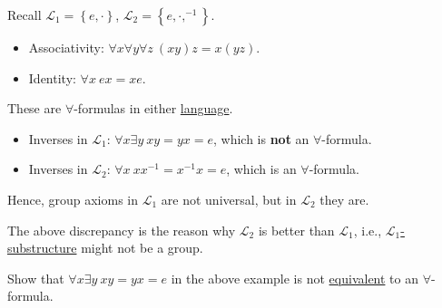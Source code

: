 \begin{eg}
	Recall \(\mathcal{L} _1 = \left\{ e, \cdot \right\} \), \(\mathcal{L} _2=\left\{ e, \cdot, ^{-1} \right\} \).
	\begin{itemize}
		\item Associativity: \(\forall x \forall y \forall z\ (xy)z = x(yz)\).
		\item Identity: \(\forall x\ ex = xe\).
	\end{itemize}
	These are \(\forall \)-formulas in either \hyperref[def:language]{language}.
	\begin{itemize}
		\item Inverses in \(\mathcal{L} _1\): \(\forall x \exists y\ xy = yx = e\), which is \textbf{not} an \(\forall \)-formula.
		\item Inverses in \(\mathcal{L} _2\): \(\forall x\ x x ^{-1} = x ^{-1} x = e\), which is an \(\forall \)-formula.
	\end{itemize}
	Hence, group axioms in \(\mathcal{L} _1\) are not universal, but in \(\mathcal{L} _2\) they are.
\end{eg}

\begin{remark}
	The above discrepancy is the reason why \(\mathcal{L} _2\) is better than \(\mathcal{L} _1\), i.e., \hyperref[def:substructure]{\(\mathcal{L} _1\)-substructure} might not be a group.
\end{remark}

\begin{problem*}
	Show that \(\forall x \exists y\ xy = yx = e\) in the above example is not \hyperref[def:equivalent]{equivalent} to an \(\forall \)-formula.
\end{problem*}